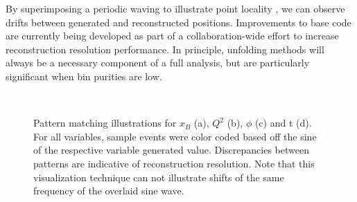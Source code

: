     By superimposing a periodic waving to illustrate point locality , we can observe drifts between generated and reconstructed positions. Improvements to base code are currently being developed as part of a collaboration-wide effort to increase reconstruction resolution performance. In principle, unfolding methods will always be a necessary component of a full analysis, but are particularly significant when bin purities are low. 
    
    \begin{figure}[H]
        \centering
        \hfill
        \\
        \hfill
        \caption[Truth vs. Observed Binning Variable Samples]{Pattern matching illustrations for $x_B$ (a), $Q^2$ (b), $\phi$ (c) and t (d). For all variables, sample events were color coded based off the sine of the respective variable generated value. Discrepancies between patterns are indicative of reconstruction resolution. Note that this visualization technique can not illustrate shifts of the same frequency of the overlaid sine wave.}
        \label{fig:bin_waving}
    \end{figure}
